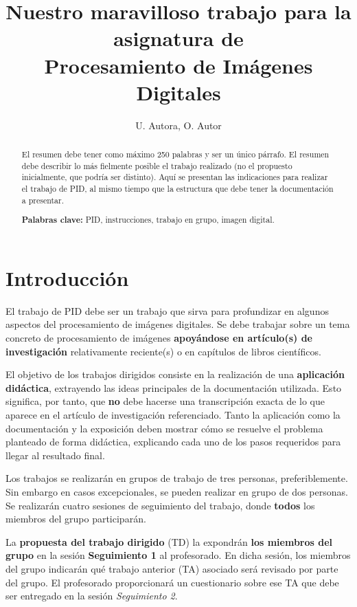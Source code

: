 \documentclass[a4paper]{article}
\title{Nuestro maravilloso trabajo para la asignatura de\\
Procesamiento de Imágenes Digitales}
\author{U. Autora, O. Autor}
\begin{document}
\maketitle

\begin{abstract}
 \noindent El resumen debe tener como máximo 250 palabras y ser un único párrafo. El resumen debe describir lo más fielmente posible el trabajo realizado (no el propuesto inicialmente, que podría ser distinto). Aquí se presentan las indicaciones para realizar el trabajo de PID, al mismo tiempo que la estructura que debe tener la documentación a presentar. 

\hspace{1cm}

\noindent \textbf{Palabras clave:} 
PID, instrucciones, trabajo en grupo, imagen digital.
\end{abstract}


\section{Introducción}

El trabajo de PID debe ser un trabajo que sirva para profundizar en algunos aspectos del procesamiento de imágenes digitales. Se debe trabajar sobre un tema concreto de procesamiento de imágenes {\bf apoyándose en artículo(s) de investigación} relativamente reciente(s) o en capítulos de libros científicos.

El objetivo de los trabajos dirigidos consiste en la realización de una {\bf aplicación didáctica}, extrayendo las ideas principales de la documentación utilizada. Esto significa, por tanto, que {\bf no} debe hacerse una transcripción exacta de lo que aparece en el artículo de investigación referenciado. Tanto la aplicación como la documentación y la exposición deben mostrar cómo se resuelve el problema planteado de forma didáctica, explicando cada uno de los pasos requeridos para llegar al resultado final.

Los trabajos se realizarán en grupos de trabajo de tres personas, preferiblemente. Sin embargo en casos excepcionales, se pueden realizar en grupo de dos personas.  Se realizarán cuatro sesiones de seguimiento del trabajo, donde \textbf{todos} los miembros del grupo participarán. 

La \textbf{propuesta del trabajo dirigido} (TD) la expondrán  \textbf{los miembros del grupo}  en la sesión \textbf{Seguimiento 1} al profesorado. En dicha sesión, los miembros del grupo indicarán  qué trabajo anterior (TA) asociado será revisado por parte del grupo. El profesorado proporcionará un cuestionario sobre ese TA que debe ser entregado en la sesión \textit{Seguimiento 2}.
\end{document}
